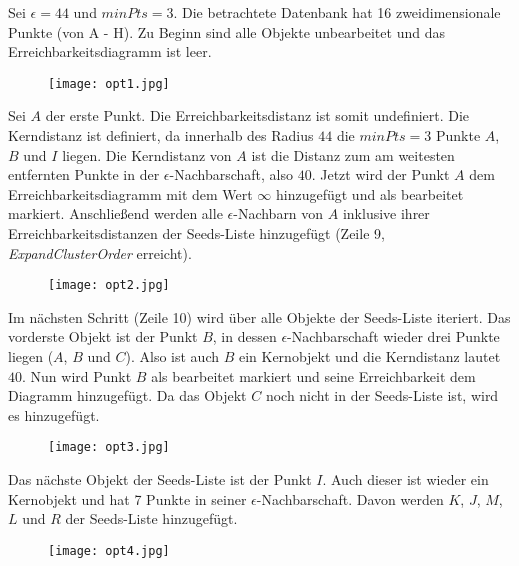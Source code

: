 \documentclass[11pt,ceqn]{book}
\begin{document}
Sei $\epsilon = 44$ und $minPts = 3$. Die betrachtete Datenbank hat 16 zweidimensionale Punkte (von A - H). Zu Beginn sind alle Objekte unbearbeitet und das Erreichbarkeitsdiagramm ist leer. 
\begin{figure}[H]
\centering
\texttt{[image: opt1.jpg]}
\end{figure}
Sei $A$ der erste Punkt. Die Erreichbarkeitsdistanz ist somit undefiniert. Die Kerndistanz ist definiert, da innerhalb des Radius $44$ die $minPts = 3$ Punkte $A$, $B$ und $I$ liegen. Die Kerndistanz von $A$ ist die Distanz zum am weitesten entfernten Punkte in der $\epsilon$-Nachbarschaft, also $40$. Jetzt wird der Punkt $A$ dem Erreichbarkeitsdiagramm mit dem Wert $\infty$ hinzugefügt und als bearbeitet markiert. Anschließend werden alle $\epsilon$-Nachbarn von $A$ inklusive ihrer Erreichbarkeitsdistanzen der Seeds-Liste hinzugefügt (Zeile 9, \textit{ExpandClusterOrder} erreicht).
\begin{figure}[H]
\centering
\texttt{[image: opt2.jpg]}
\end{figure}
Im nächsten Schritt (Zeile 10) wird über alle Objekte der Seeds-Liste iteriert. Das vorderste Objekt ist der Punkt $B$, in dessen $\epsilon$-Nachbarschaft wieder drei Punkte liegen ($A$, $B$ und $C$). Also ist auch $B$ ein Kernobjekt und die Kerndistanz lautet $40$. Nun wird Punkt $B$ als bearbeitet markiert und seine Erreichbarkeit dem Diagramm hinzugefügt. Da das Objekt $C$ noch nicht in der Seeds-Liste ist, wird es hinzugefügt.
\begin{figure}[H]
\centering
\texttt{[image: opt3.jpg]}
\end{figure}
Das nächste Objekt der Seeds-Liste ist der Punkt $I$. Auch dieser ist wieder ein Kernobjekt und hat 7 Punkte in seiner $\epsilon$-Nachbarschaft. Davon werden $K$, $J$, $M$, $L$ und $R$ der Seeds-Liste hinzugefügt.
\begin{figure}[H]
\centering
\texttt{[image: opt4.jpg]}
\end{figure}
\end{document}
